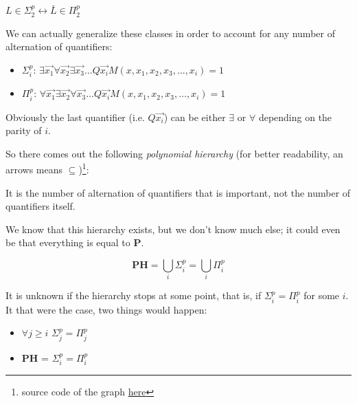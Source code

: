     \begin{observation}
        $ L \in \Sigma_2^p \leftrightarrow \bar{L} \in \Pi_2^p $
    \end{observation}

    We can actually generalize these classes in order to account for any number of alternation of quantifiers:
    \begin{itemize}
        \item $\Sigma_i^p$: $\exists \vec{x_1} \forall \vec{x_2} \exists \vec{x_3} \dots Q \vec{x_i} M(x, x_1, x_2, x_3, \dots, x_i) = 1$
        \item $\Pi_i^p$: $\forall \vec{x_1} \exists \vec{x_2} \forall \vec{x_3} \dots Q \vec{x_i} M(x, x_1, x_2, x_3, \dots, x_i) = 1$
    \end{itemize}

    Obviously the last quantifier (i.e. $Q \vec{x_i}$) can be either $\exists$ or $\forall$ depending on the parity of $i$.

    So there comes out the following \textit{polynomial hierarchy} (for better readability, an arrows means $\subseteq$)\footnote{source code of the graph \href{https://en.wikipedia.org/wiki/File:Polynomial_time_hierarchy.svg}{here}}:
    
    \begin{center}
        
    \end{center}

    It is the number of alternation of quantifiers that is important, not the number of quantifiers itself.

    We know that this hierarchy exists, but we don't know much else; it could even be that everything is equal to \textbf{P}.

    \begin{definition}[\textbf{PH}]\label{def:ph}
        \[ \bm{PH} = \bigcup_i \Sigma_i^p = \bigcup_i \Pi_i^p \]
    \end{definition}

    It is unknown if the hierarchy stops at some point, that is, if $\Sigma_i^p = \Pi_i^p$ for some $i$.
    It that were the case, two things would happen:
    \begin{itemize}
        \item  $\forall j \geq i$ $\Sigma_j^p = \Pi_j^p$
        \item \textbf{PH} = $\Sigma_i^p = \Pi_i^p$
    \end{itemize}

